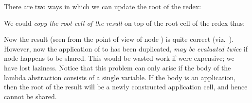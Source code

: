 There are two ways in which we can update the root of the redex:

\begin{numbered}
    \item We could \textit{copy the root cell of the result} on top of the root cell of the redex
    thus:


    Now the result (seen from the point of view of node \ml{\$}) is quite correct
    (viz.\ ). However, now the application of  to  has been duplicated,
     \textit{may be evaluated twice} if node \ml{\#} happens to be shared. This would be
    wasted work if  were expensive; we have lost laziness. Notice that this
    problem can only arise if the body of the lambda abstraction consists of a
    single variable. If the body is an application, then the root of the result
    will be a newly constructed application cell, and hence cannot be shared.


\end{numbered}

